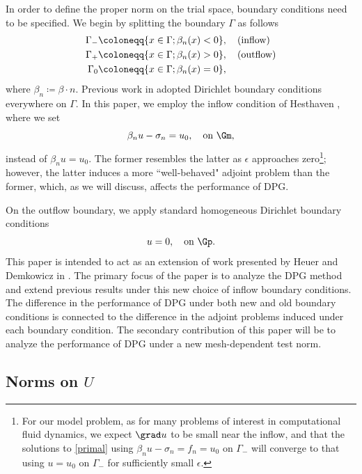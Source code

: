 In order to define the proper norm on the trial space, boundary
conditions need to be specified. We begin by splitting the boundary
$\Gamma$ as follows
\begin{align*}
\Gamma_{-} &\coloneqq \{x\in \Gamma; \beta_n(x) < 0\}, \quad {\rm
  (inflow)}\\ \Gamma_{+} &\coloneqq \{x\in \Gamma; \beta_n(x) > 0\},
\quad {\rm (outflow)}\\ \Gamma_{0} &\coloneqq \{x\in \Gamma;
\beta_n(x) = 0\},
\end{align*}
where $\beta_n \coloneqq \beta \cdot n$.
Previous work in \cite{DPGrobustness} adopted Dirichlet boundary
conditions everywhere on $\Gamma$.  
In this paper, we employ the inflow
condition of Hesthaven \etal \cite{Hesthaven96astable}, where we set
\[
\beta_n u - \sigma_n  = u_0, \quad \text{on } \Gm,
\]
instead of $\beta_n u = u_0$. The former resembles the latter
as $\epsilon$ approaches zero\footnote{For our model problem, as for many problems of interest in computational fluid dynamics, we expect $\grad u$ to be small near the inflow, and that the solutions to \eqref{primal} using $\beta_n u - \sigma_n = f_n = u_0$ on $\Gamma_-$ will converge to that using $u=u_0$ on $\Gamma_-$  for sufficiently small $\epsilon$.}; however, the latter induces a more ``well-behaved" adjoint problem than the former, which, as we will discuss, affects the performance of DPG. 

On the outflow boundary, we apply standard homogeneous Dirichlet boundary conditions
\[
u = 0, \quad \text{on } \Gp.
\]
This paper is intended to act as an extension of work presented by Heuer and Demkowicz in \cite{DPGrobustness}. The primary focus of the paper is to analyze the DPG method and extend previous results under this new choice of inflow boundary conditions. The difference in the performance of DPG under both new and old boundary conditions is connected to the difference in the adjoint problems induced under each boundary condition. The secondary contribution of this paper will be to analyze the performance of DPG under a new mesh-dependent test norm. 

\subsection{Norms on $U$}

